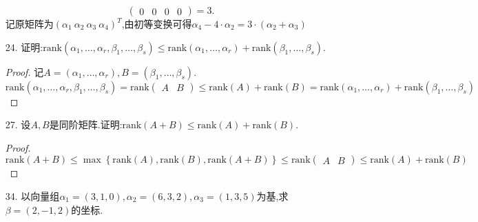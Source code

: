 \documentclass{article}
\begin{document}
\begin{enumerate}
\[\begin{pmatrix}
            0 & 0 & 0 & 0
        \end{pmatrix}
        =3.
    \]
    记原矩阵为${(\alpha_1\ \alpha_2\ \alpha_3\ \alpha_4)}^T$,由初等变换可得$\alpha_4 -4\cdot \alpha_2=3\cdot(\alpha_2+\alpha_3)$
    \item [24.]证明:$\mbox{rank}(\alpha_1,\ldots,\alpha_r,\beta_1,\ldots,\beta_s)\leqslant\mbox{rank}(\alpha_1,\ldots,\alpha_r)+\mbox{rank}(\beta_1,\ldots,\beta_s)$.
    \begin{proof}记$A=(\alpha_1,\ldots,\alpha_r),B=(\beta_1,\ldots,\beta_s)$.
        \[
            \mbox{rank}(\alpha_1,\ldots,\alpha_r,\beta_1,\ldots,\beta_s)
            =\mbox{rank}\begin{pmatrix}A & B \end{pmatrix}
            \leqslant
            \mbox{rank}(A)+\mbox{rank}(B)
            =\mbox{rank}(\alpha_1,\ldots,\alpha_r)+\mbox{rank}(\beta_1,\ldots,\beta_s)
        \]
    \end{proof}
    \item [27.]设$A,B$是同阶矩阵.证明:$\mbox{rank}(A+B)\leqslant\mbox{rank}(A)+\mbox{rank}(B)$.
    \begin{proof}
        \[
            \mbox{rank}(A+B)\leqslant
            \max\left\{\mbox{rank}(A),\mbox{rank}(B),\mbox{rank}(A+B)\right\}
            \leqslant
            \mbox{rank}\begin{pmatrix}
                A & B
            \end{pmatrix}
            \leqslant
            \mbox{rank}(A)+\mbox{rank}(B)
        \]
    \end{proof}
    \item [34.]以向量组$\alpha_1=(3,1,0),\alpha_2=(6,3,2),\alpha_3=(1,3,5)$为基,求$\beta=(2,-1,2)$的坐标.
    

\end{enumerate}
\end{document}
